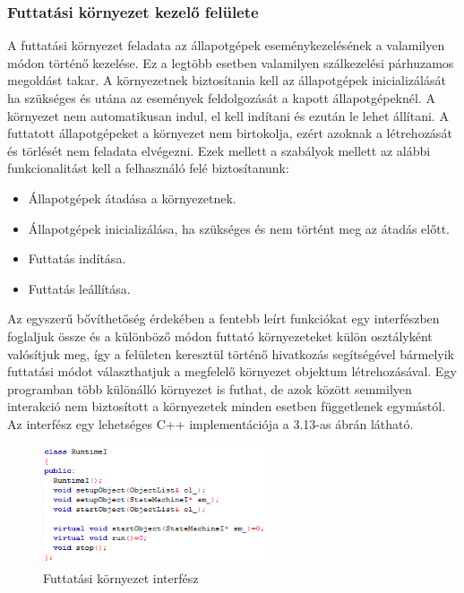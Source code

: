 \documentclass[a4paper,12pt]{report}
\begin{document}
\subsubsection{Futtatási környezet kezelő felülete}
A futtatási környezet feladata az állapotgépek eseménykezelésének a valamilyen módon történő kezelése. Ez a legtöbb esetben valamilyen szálkezelési párhuzamos megoldást takar. A környezetnek biztosítania kell az állapotgépek inicializálását ha szükséges és utána az események feldolgozását a kapott állapotgépeknél. A környezet nem automatikusan indul, el kell indítani és ezután le lehet állítani. A futtatott állapotgépeket a környezet nem birtokolja, ezért azoknak a létrehozását és törlését nem feladata elvégezni. Ezek mellett a szabályok mellett az alábbi funkcionalitást kell a felhasználó felé biztosítanunk:
\begin{itemize}
\item Állapotgépek átadása a környezetnek.
\item Állapotgépek inicializálása, ha szükséges és nem történt meg az átadás előtt.
\item Futtatás indítása.
\item Futtatás leállítása.
\end{itemize} 
Az egyszerű bővíthetőség érdekében a fentebb leírt funkciókat egy interfészben foglaljuk össze és a különböző módon futtató környezeteket külön osztályként valósítjuk meg, így a felületen keresztül történő hivatkozás segítségével bármelyik futtatási módot választhatjuk a megfelelő környezet objektum létrehozásával. Egy programban több különálló környezet is futhat, de azok között semmilyen interakció nem biztosított a környezetek minden esetben függetlenek egymástól. Az interfész egy lehetséges C++ implementációja a 3.13-as ábrán látható.

\pagebreak

\begin{figure}[hbtp]
\centering
\includegraphics[width=0.6\textwidth]{runtimei.png}
\caption{Futtatási környezet interfész}
\label{fig:runit}
\end{figure}
\end{document}
